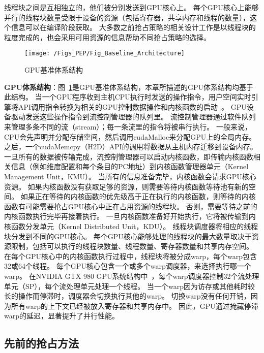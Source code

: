 线程块之间是互相独立的，他们被分别发送到GPU核心上。
每个GPU核心上能够并行的线程块数量受限于设备的资源（包括寄存器，共享内存和线程的数量），这个信息可以在编译阶段获取。
大多数之前抢占策略的相关设计工作是以线程块的粒度完成的，也会采用可用资源的信息帮助不同抢占策略的选择。


\begin{figure}[htbp] %
  \centering
  \texttt{[image: /Figs\_PEP/Fig\_Baseline\_Architecture]}
  \caption{GPU基准体系结构}
  \label{fig:Fig_Baseline_Architecture}
\end{figure}


\textbf{GPU体系结构}：图~\ref{fig:Fig_Baseline_Architecture}是GPU基准体系结构，本章所描述的GPU体系结构均基于此结构。
当一个GPU程序收到主机CPU执行时发送的操作指令，用户空间实时引擎将API调用指令转换为相关的GPU控制数据操作和内核函数的启动~。
GPU设备驱动发送这些操作指令到流控制管理器的队列里。
流控制管理器通过软件队列来管理多条不同的流（stream）；每一条流里的指令将被串行执行。
一般来说，CPU会先声明并分配存储空间，然后调用cudaMalloc来分配GPU上的全局内存。
之后，一个cudaMemcpy（H2D）API的调用将数据从主机内存迁移到设备内存。
一旦所有的数据被传输完成，流控制管理器可以启动内核函数，即传输内核函数相关信息（例如维度配置和每个条目的PC地址）到内核函数管理器单元（Kernel Management Unit，KMU）。
当所有的信息准备完毕，内核函数会请求GPU核心资源。
如果内核函数没有获取足够的资源，则需要等待内核函数等待池有新的空间。
如果正在等待的内核函数的优先级高于正在执行的内核函数，则等待的内核函数有可能需要抢占GPU核心中正在占用资源的线程块。
否则，需要等待之前的内核函数执行完毕再接着执行。
一旦内核函数准备好开始执行，它将被传输到内核函数分发单元（Kernel Distributed Unit，KDU）。
线程块调度器将相应的线程块分发到不同的GPU核心。
每个GPU核心能够处理的线程块的最大数量取决于资源限制，包括可以执行的线程块数量、线程数量、寄存器数量和共享内存空间。
在每个GPU核心中的内核函数执行过程中，线程块将被分成warp，每个warp包含32或64个线程。
每个GPU核心包含一个或多个warp调度器，来选择执行哪一个warp。
在NVIDIA GTX 980 GPU系统结构中~，每个warp调度器控制32个流处理单元（SP），每个流处理单元处理一个线程。
当一个warp因为访存或其他耗时较长的操作而停滞时，调度器会切换执行其他的warp。
切换warp没有任何开销，因为所有warp的上下文已经被放入寄存器和共享内存中。
因此，GPU通过掩藏停滞warp的延迟，显著提升了并行性能。

\subsection{先前的抢占方法}

